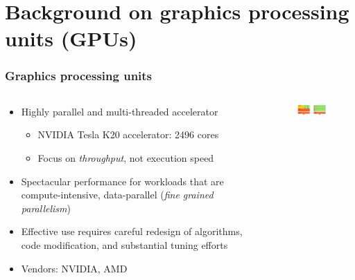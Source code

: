 \section{Background on graphics processing units (GPUs)}

\begin{frame}[t]
\frametitle{Graphics processing units}
\begin{columns}[T]
\begin{column}{0.5\textwidth}
\begin{itemize}
\item Highly parallel and multi-threaded accelerator
    \begin{itemize}
        \item NVIDIA Tesla K20 accelerator: 2496 cores
        \item Focus on \emph{throughput}, not execution speed
    \end{itemize}
\item Spectacular performance for workloads that
    are compute-intensive, data-parallel
    (\emph{fine grained parallelism})
\item Effective use requires careful redesign
    of algorithms, code modification,
    and substantial tuning efforts
\item Vendors: NVIDIA, AMD
\end{itemize}
\end{column}
\begin{column}{0.5\textwidth}
\begin{figure}
\begin{center}
\includegraphics[width=150px]{img/device-comparison.png}
\centering
\end{center}
\end{figure}
\end{column}
\end{columns}
\end{frame}

